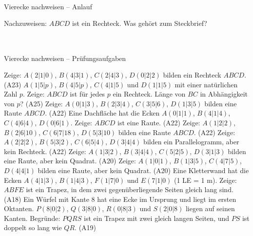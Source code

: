 \setcounter{aufgabe}{0}

\begin{aufgabe}{Vierecke nachweisen – Anlauf}
\begin{teile}
\teil Nachzuweisen: $ABCD$ ist ein Rechteck. Was gehört zum Steckbrief? \\  \\  \\ 
\end{teile}
\end{aufgabe}

\begin{aufgabe}{Vierecke nachweisen – Prüfungsaufgaben}
\begin{teile}
\teil Zeige: $A(2 | 1 | 0)$, $B(4 | 3 | 1)$, $C(2 | 4 | 3)$, $D(0 | 2 | 2)$ bilden ein Rechteck $ABCD$. \hfill (A23)
\teil $A(1 | 5 | p)$, $B(4 | 5 | p)$, $C(4 | 1 | 5)$ und $D(1 | 1 | 5)$ mit einer natürlichen Zahl $p$. Zeige: $ABCD$ ist für jedes $p$ ein Rechteck. Länge von $BC$ in Abhängigkeit von $p$? \hfill (A25)
\teil Zeige: $A(0 | 1 | 3)$, $B(2 | 3 | 4)$, $C(3 | 5 | 6)$, $D(1 | 3 | 5)$ bilden eine Raute $ABCD$. \hfill (A22)
\teil Eine Dachfläche hat die Ecken $A(0 | 1 | 1)$, $B(4 | 1 | 4)$, $C(4 | 6 | 4)$, $D(0 | 6 | 1)$. Zeige: $ABCD$ ist eine Raute. \hfill (A22)
\teil Zeige: $A(1 | 2 | 2)$, $B(2 | 6 | 10)$, $C(6 | 7 | 18)$, $D(5 | 3 | 10)$ bilden eine Raute $ABCD$. \hfill (A22)
\teil Zeige: $A(2 | 2 | 2)$, $B(5 | 3 | 2)$, $C(6 | 5 | 4)$, $D(3 | 4 | 4)$ bilden ein Parallelogramm, aber kein Rechteck. \hfill (A22)
\teil Zeige: $A(1 | 3 | 2)$, $B(3 | 4 | 4)$, $C(5 | 2 | 5)$, $D(3 | 1 | 3)$ bilden eine Raute, aber kein Quadrat. \hfill (A20)
\teil Zeige: $A(1 | 0 | 1)$, $B(1 | 3 | 5)$, $C(4 | 7 | 5)$, $D(4 | 4 | 1)$ bilden eine Raute, aber kein Quadrat. \hfill (A20)
\teil Eine Kletterwand hat die Ecken $A(4 | 1 | 3)$, $B(1 | 4 | 3)$, $F(1 | 7 | 0)$ und $E(7 | 1 | 0)$ (1 LE = 1 m). Zeige: $ABFE$ ist ein Trapez, in dem zwei gegenüberliegende Seiten gleich lang sind. \hfill (A18)
\teil Ein Würfel mit Kante $8$ hat eine Ecke im Ursprung und liegt im ersten Oktanten. $P(8 | 0 | 2)$, $Q(3 | 8 | 0)$, $R(0 | 8 | 3)$ und $S(2 | 0 | 8)$ liegen auf seinen Kanten. Begründe: $PQRS$ ist ein Trapez mit zwei gleich langen Seiten, und $PS$ ist doppelt so lang wie $QR$. \hfill (A19)
\end{teile}
\end{aufgabe}

